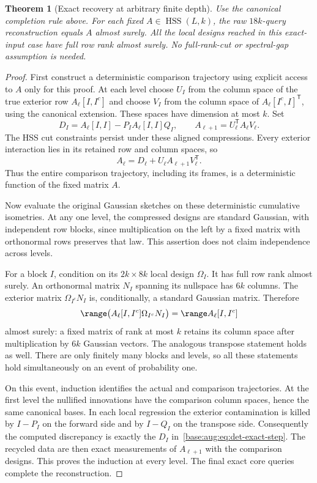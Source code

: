 \documentclass[11pt,oneside,openany,a4paper]{book}
\numberwithin{equation}{chapter}
\newtheorem{theorem}{Theorem}[chapter]
\theoremstyle{definition}
\theoremstyle{remark}
\newcommand{\T}{\mathsf T}\newcommand{\Id}{I}
\DeclareMathOperator{\HSS}{HSS}\DeclareMathOperator{\dist}{dist}
\begin{document}
\begin{theorem}[Exact recovery at arbitrary finite depth]\label{base:aug:thm:exact}
Use the canonical completion rule above. For each fixed
$A\in\HSS(L,k)$, the raw $18k$-query reconstruction equals $A$ almost surely.
All the local designs reached in this exact-input case have full row rank
almost surely. No full-rank-cut or spectral-gap assumption is needed.
\end{theorem}
\begin{proof}
First construct a deterministic comparison trajectory using explicit
access to $A$ only for this proof. At each level choose $U_I$ from the
column space of the true exterior row $A_\ell[I,I^c]$ and choose $V_I$
from the column space of $A_\ell[I^c,I]^{\T}$, using the canonical extension.
These spaces have dimension at most $k$. Set
\[
 D_I=A_\ell[I,I]-P_IA_\ell[I,I]Q_I,
 \qquad A_{\ell+1}=U_\ell^{\T}A_\ell V_\ell.
\]
The HSS cut constraints persist under these aligned compressions.
Every exterior interaction lies in its retained row and column spaces, so
\begin{equation}\label{base:aug:eq:det-exact-step}
 A_\ell=D_\ell+U_\ell A_{\ell+1}V_\ell^{\T}.
\end{equation}
Thus the entire comparison trajectory, including its frames, is a
deterministic function of the fixed matrix $A$.

Now evaluate the original Gaussian sketches on these deterministic
cumulative isometries. At any one level, the compressed designs are standard
Gaussian, with independent row blocks, since multiplication on the left by
a fixed matrix with orthonormal rows preserves that law. This assertion
does not claim independence across levels.

For a block $I$, condition on its $2k\times8k$ local design $\Omega_I$.
It has full row rank almost surely. An orthonormal matrix $N_I$ spanning
its nullspace has $6k$ columns. The exterior matrix
$\Omega_{I^c}N_I$ is, conditionally, a standard Gaussian matrix. Therefore
\[
 \range\big(A_\ell[I,I^c]\Omega_{I^c}N_I\big)
   =\range A_\ell[I,I^c]
\]
almost surely: a fixed matrix of rank at most $k$ retains its column space
after multiplication by $6k$ Gaussian vectors. The analogous transpose
statement holds as well. There are only finitely many blocks and levels,
so all these statements hold simultaneously on an event of probability one.

On this event, induction identifies the actual and comparison trajectories.
At the first level the nullified innovations have the comparison column
spaces, hence the same canonical bases. In each local regression the
exterior contamination is killed by $I-P_I$ on the forward side and by
$I-Q_I$ on the transpose side. Consequently the computed discrepancy is
exactly the $D_I$ in~\eqref{base:aug:eq:det-exact-step}. The recycled data are then
exact measurements of $A_{\ell+1}$ with the comparison designs. This proves
the induction at every level. The final exact core queries complete the
reconstruction.
\end{proof}
\end{document}
